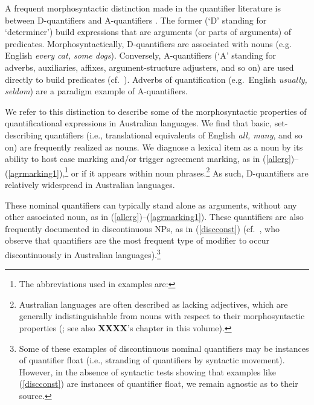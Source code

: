 \documentclass[12pt,egregdoesnotlikesansseriftitles]{scrartcl}
\begin{document}
A frequent morphosyntactic distinction made in the quantifier literature is between D-quantifiers and A-quantifiers \citep{partee95}. %
The former (`D' standing for `determiner') build expressions that are arguments (or parts of arguments) of predicates.  Morphosyntactically, D-quantifiers are associated with nouns (e.g. English \textit{every cat, some dogs}). Conversely, A-quantifiers (`A' standing for adverbs, auxiliaries, affixes, argument-structure adjusters, and so on) are used directly to build predicates (cf.\ \citealt{keenan17qu}). Adverbs of quantification (e.g.\ English \textit{usually, seldom}) are a paradigm example of A-quantifiers.

We refer to this distinction to describe some of the morphosyntactic properties of quantificational expressions in Australian languages. We find that basic, set-describing quantifiers (i.e., translational equivalents of English \textit{all, many}, and so on) are frequently realized as nouns. We diagnose a lexical item as a noun by its ability to host case marking and/or trigger agreement marking, as in (\ref{allerg})--(\ref{agrmarking1}),\footnote{The abbreviations used in examples are: \printglossary[style=inline,type=\leipzigtype]} or if it appears within noun phrases.\footnote{Australian languages are often described as lacking adjectives, which are generally indistinguishable from nouns with respect to their morphosyntactic properties (\citealt[67--68]{dixon02}; see also \textbf{XXXX}'s chapter in this volume).} As such, D-quantifiers are relatively widespread in Australian languages.

These nominal quantifiers can typically stand alone as arguments, without any other associated noun, as in (\ref{allerg})--(\ref{agrmarking1}). These quantifiers are also frequently documented in discontinuous NPs, as in (\ref{discconst}) (cf.\ \citealt[51--52]{louagieverstraete16}, who observe that quantifiers are the most frequent type of modifier to occur discontinuously in Australian languages).\footnote{Some of these examples of discontinuous nominal quantifiers may be instances of quantifier float (i.e., stranding of quantifiers by syntactic movement). However, in the absence of syntactic tests showing that examples like (\ref{discconst}) are instances of quantifier float, we remain agnostic as to their source.}
\end{document}
